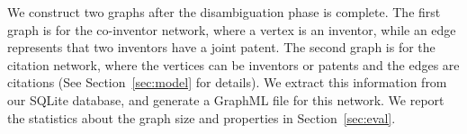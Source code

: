 We construct two graphs after the disambiguation phase is complete. 
The first graph is for the co-inventor network, where a vertex is an inventor, while an edge represents that two inventors have a joint patent. The second graph is for the citation network, where the vertices can be inventors or patents and the edges are citations (See Section~\ref{sec:model} for details).
We extract this information from our SQLite database, and generate a GraphML file for this network.
We report the statistics about the graph size and properties in Section~\ref{sec:eval}.









  

